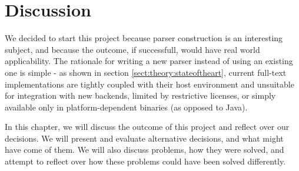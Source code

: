 \chapter{Discussion}
We decided to start this project because parser construction is an interesting
subject, and because the outcome, if successfull, would have real world
applicability. The rationale for writing a new parser instead of using an
existing one is simple - as shown in section \ref{sect:theory:stateoftheart},
current full-text implementations are tightly coupled with their
host environment and unsuitable for integration with new backends, limited by
restrictive licenses, or simply available only in platform-dependent binaries
(as opposed to Java). 

In this chapter, we will discuss the outcome of this project and reflect over
our decisions. We will present and evaluate alternative decisions, and what
might have come of them. We will also discuss problems, how they were
solved, and attempt to reflect over how these problems could have been solved
differently.























